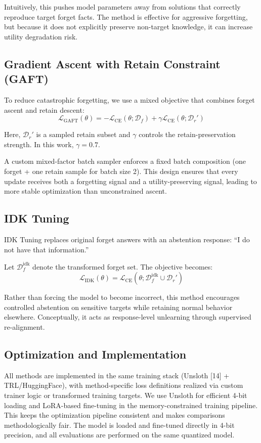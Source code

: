 \documentclass[conference]{IEEEtran}
\begin{document}
Intuitively, this pushes model parameters away from solutions that correctly reproduce target forget facts. The method is effective for aggressive forgetting, but because it does not explicitly preserve non-target knowledge, it can increase utility degradation risk.

\subsection{Gradient Ascent with Retain Constraint (GAFT)}
To reduce catastrophic forgetting, we use a mixed objective that combines forget ascent and retain descent:
\begin{equation}
\mathcal{L}_{\mathrm{GAFT}}(\theta) = -\mathcal{L}_{\mathrm{CE}}(\theta; \mathcal{D}_f) + \gamma\mathcal{L}_{\mathrm{CE}}(\theta; \mathcal{D}_r')
\end{equation}

Here, $\mathcal{D}_r'$ is a sampled retain subset and $\gamma$ controls the retain-preservation strength. In this work, $\gamma = 0.7$.

A custom mixed-factor batch sampler enforces a fixed batch composition (one forget + one retain sample for batch size 2). This design ensures that every update receives both a forgetting signal and a utility-preserving signal, leading to more stable optimization than unconstrained ascent.

\subsection{IDK Tuning}
IDK Tuning replaces original forget answers with an abstention response: ``I do not have that information.''

Let $\mathcal{D}_f^{\mathrm{idk}}$ denote the transformed forget set. The objective becomes:
\begin{equation}
\mathcal{L}_{\mathrm{IDK}}(\theta) = \mathcal{L}_{\mathrm{CE}}(\theta; \mathcal{D}_f^{\mathrm{idk}} \cup \mathcal{D}_r')
\end{equation}

Rather than forcing the model to become incorrect, this method encourages controlled abstention on sensitive targets while retaining normal behavior elsewhere. Conceptually, it acts as response-level unlearning through supervised re-alignment.

\subsection{Optimization and Implementation}
All methods are implemented in the same training stack (Unsloth [14] + TRL/HuggingFace), with method-specific loss definitions realized via custom trainer logic or transformed training targets. We use Unsloth for efficient 4-bit loading and LoRA-based fine-tuning in the memory-constrained training pipeline. This keeps the optimization pipeline consistent and makes comparisons methodologically fair. The model is loaded and fine-tuned directly in 4-bit precision, and all evaluations are performed on the same quantized model.
\end{document}
